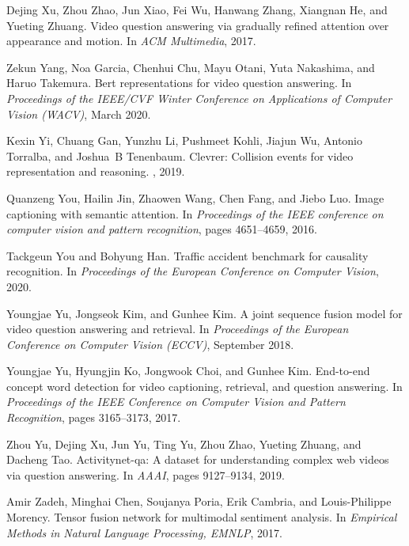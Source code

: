 \documentclass[final]{cvpr}
\begin{document}
{\begin{thebibliography}{10}
Dejing Xu, Zhou Zhao, Jun Xiao, Fei Wu, Hanwang Zhang, Xiangnan He, and Yueting
  Zhuang.
\newblock Video question answering via gradually refined attention over
  appearance and motion.
\newblock In {\em ACM Multimedia}, 2017.

Zekun Yang, Noa Garcia, Chenhui Chu, Mayu Otani, Yuta Nakashima, and Haruo
  Takemura.
\newblock Bert representations for video question answering.
\newblock In {\em Proceedings of the IEEE/CVF Winter Conference on Applications
  of Computer Vision (WACV)}, March 2020.

Kexin Yi, Chuang Gan, Yunzhu Li, Pushmeet Kohli, Jiajun Wu, Antonio Torralba,
  and Joshua~B Tenenbaum.
\newblock Clevrer: Collision events for video representation and reasoning.
, 2019.

Quanzeng You, Hailin Jin, Zhaowen Wang, Chen Fang, and Jiebo Luo.
\newblock Image captioning with semantic attention.
\newblock In {\em Proceedings of the IEEE conference on computer vision and
  pattern recognition}, pages 4651--4659, 2016.

Tackgeun You and Bohyung Han.
\newblock Traffic accident benchmark for causality recognition.
\newblock In {\em Proceedings of the European Conference on Computer Vision},
  2020.

Youngjae Yu, Jongseok Kim, and Gunhee Kim.
\newblock A joint sequence fusion model for video question answering and
  retrieval.
\newblock In {\em Proceedings of the European Conference on Computer Vision
  (ECCV)}, September 2018.

Youngjae Yu, Hyungjin Ko, Jongwook Choi, and Gunhee Kim.
\newblock End-to-end concept word detection for video captioning, retrieval,
  and question answering.
\newblock In {\em Proceedings of the IEEE Conference on Computer Vision and
  Pattern Recognition}, pages 3165--3173, 2017.

Zhou Yu, Dejing Xu, Jun Yu, Ting Yu, Zhou Zhao, Yueting Zhuang, and Dacheng
  Tao.
\newblock Activitynet-qa: A dataset for understanding complex web videos via
  question answering.
\newblock In {\em AAAI}, pages 9127--9134, 2019.

Amir Zadeh, Minghai Chen, Soujanya Poria, Erik Cambria, and Louis-Philippe
  Morency.
\newblock Tensor fusion network for multimodal sentiment analysis.
\newblock In {\em Empirical Methods in Natural Language Processing, EMNLP},
  2017.


\end{thebibliography}}
\end{document}
